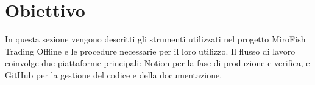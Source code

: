 \section{Obiettivo}

In questa sezione vengono descritti gli strumenti utilizzati nel progetto MiroFish Trading Offline e le procedure necessarie per il loro utilizzo. Il flusso di lavoro coinvolge due piattaforme principali: Notion per la fase di produzione e verifica, e GitHub per la gestione del codice e della documentazione.
